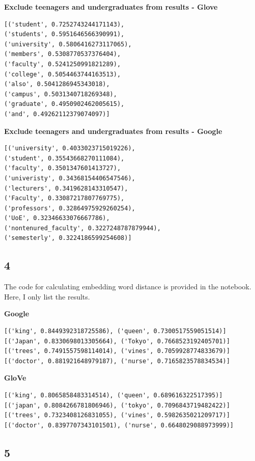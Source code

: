 \documentclass[8pt,a4paper]{report}%
\begin{document}
\textbf{Exclude teenagers and undergraduates from results - Glove}

\begin{lstlisting}
[('student', 0.7252743244171143),
('students', 0.5951646566390991),
('university', 0.5806416273117065),
('members', 0.5308770537376404),
('faculty', 0.5241250991821289),
('college', 0.5054463744163513),
('also', 0.5041286945343018),
('campus', 0.5031340718269348),
('graduate', 0.4950902462005615),
('and', 0.49262112379074097)]
\end{lstlisting}

\textbf{Exclude teenagers and undergraduates from results - Google}

\begin{lstlisting}
[('university', 0.4033023715019226),
('student', 0.35543668270111084),
('faculty', 0.3501347601413727),
('univeristy', 0.34368154406547546),
('lecturers', 0.3419628143310547),
('Faculty', 0.33087217807769775),
('professors', 0.32864975929260254),
('UoE', 0.32346633076667786),
('nontenured_faculty', 0.3227248787879944),
('semesterly', 0.3224186599254608)]
\end{lstlisting}


\subsection*{4}

The code for calculating embedding word distance is provided in the notebook. Here, I only list the results.

\textbf{Google}
\begin{lstlisting}
[('king', 0.8449392318725586), ('queen', 0.7300517559051514)]
[('Japan', 0.8330698013305664), ('Tokyo', 0.7668523192405701)]
[('trees', 0.7491557598114014), ('vines', 0.7059928774833679)]
[('doctor', 0.881921648979187), ('nurse', 0.7165823578834534)]
\end{lstlisting}

\textbf{GloVe}
\begin{lstlisting}
[('king', 0.8065858483314514), ('queen', 0.689616322517395)]
[('japan', 0.8084266781806946), ('tokyo', 0.7096843719482422)]
[('trees', 0.7323408126831055), ('vines', 0.5982635021209717)]
[('doctor', 0.8397707343101501), ('nurse', 0.6648029088973999)]
\end{lstlisting}


\subsection*{5}
\end{document}
